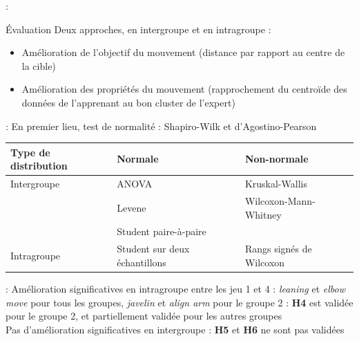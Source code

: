 \documentclass[svgnames]{beamer}
\begin{document}
	\begin{frame}{\secname : \subsecname}
		\begin{block}{Évaluation}
			Deux approches, en intergroupe et en intragroupe :
			\begin{itemize}[label=$\bullet$]
				\item Amélioration de l'objectif du mouvement (distance par rapport au centre de la cible)
				\item Amélioration des propriétés du mouvement (rapprochement du centroïde des données de l'apprenant au bon cluster de l'expert)
			\end{itemize}
		\end{block}
	\end{frame}
	
	\begin{frame}{\secname : \subsecname}
		En premier lieu, test de normalité : Shapiro-Wilk et d'Agostino-Pearson
		\begin{table}[]
			\begin{adjustbox}{max width=\textwidth}
			\begin{tabular}{l|l|l}
				Type de distribution & Normale & Non-normale \\\hline
				Intergroupe & ANOVA & Kruskal-Wallis \\
 				& Levene & Wilcoxon-Mann-Whitney \\
 				& Student paire-à-paire &  \\\hline
				Intragroupe & Student sur deux échantillons & Rangs signés de Wilcoxon
			\end{tabular}
			\end{adjustbox}
		\end{table}
	\end{frame}
	
	\begin{frame}{\secname : \subsecname}
		Amélioration significatives en intragroupe entre les jeu 1 et 4 : \textit{leaning} et \textit{elbow move} pour tous les groupes, \textit{javelin} et \textit{align arm} pour le groupe 2 : \textbf{H4} est validée pour le groupe 2, et partiellement validée pour les autres groupes\\
		\vspace{1cm}
		Pas d'amélioration significatives en intergroupe : \textbf{H5} et \textbf{H6} ne sont pas validées
		
	\end{frame}
	
\end{document}
